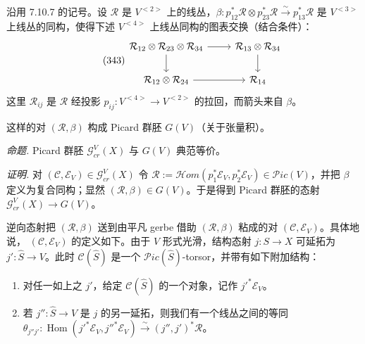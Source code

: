 沿用 7.10.7 的记号。设 $\mathcal{R}$ 是 $V^{<2>}$ 上的线丛，$\beta:p^{*}_{12}\mathcal{R}\otimes p^{*}_{23}\mathcal{R}\xrightarrow{\sim}p^{*}_{13}\mathcal{R}$ 是 $V^{<3>}$ 上线丛的同构，使得下述 $V^{<4>}$ 上线丛同构的图表交换（结合条件）：
\begin{equation}\tag{343}
\begin{tikzcd}
\mathcal{R}_{12}\otimes\mathcal{R}_{23}\otimes\mathcal{R}_{34} \arrow[r] \arrow[d] & \mathcal{R}_{13}\otimes\mathcal{R}_{34} \arrow[d]\\
\mathcal{R}_{12}\otimes\mathcal{R}_{24} \arrow[r] & \mathcal{R}_{14}
\end{tikzcd}
\end{equation}
这里 $\mathcal{R}_{ij}$ 是 $\mathcal{R}$ 经投影 $p_{ij}:V^{<4>}\to V^{<2>}$ 的拉回，而箭头来自 $\beta$。

这样的对 $(\mathcal{R},\beta)$ 构成 Picard 群胚 $G(V)$（关于张量积）。

 \emph{命题.} Picard 群胚 $\mathcal{G}^{V}_{cr}(X)$ 与 $G(V)$ 典范等价。

\emph{证明.} 对 $(\mathcal{C},\mathcal{E}_{V})\in\mathcal{G}^{V}_{cr}(X)$ 令 $\mathcal{R}:=\mathcal{H}om(p^{*}_{1}\mathcal{E}_{V},p^{*}_{2}\mathcal{E}_{V})\in\mathcal{P}ic(V)$，并把 $\beta$ 定义为复合同构；显然 $(\mathcal{R},\beta)\in G(V)$。于是得到 Picard 群胚的态射 $\mathcal{G}^{V}_{cr}(X)\to G(V)$。



逆向态射把 $(\mathcal{R},\beta)$ 送到由平凡 gerbe 借助
$(\mathcal{R},\beta)$ 粘成的对 $(\mathcal{C},\mathcal{E}_V)$。具体地说，
$(\mathcal{C},\mathcal{E}_V)$ 的定义如下。由于 $V$ 形式光滑，结构态射
$j:S\to X$ 可延拓为 $j':\hat S\to V$。此时 $\mathcal{C}(\hat S)$ 是一个
$\mathcal{P}ic(\hat S)$-torsor，并带有如下附加结构：

\begin{enumerate}[label=(\roman*),leftmargin=2.2em]
\item 对任一如上之 $j'$，给定 $\mathcal{C}(\hat S)$ 的一个对象，记作
$j'^*\mathcal{E}_V$。
\item 若 $j'':\hat S\to V$ 是 $j$ 的另一延拓，则我们有一个线丛之间的等同
$\theta_{j''j'}:\operatorname{Hom}(j'^*\mathcal{E}_V,j''^*\mathcal{E}_V)
\xrightarrow{\ \sim\ }(j'',j')^*\mathcal{R}$。
\end{enumerate}

